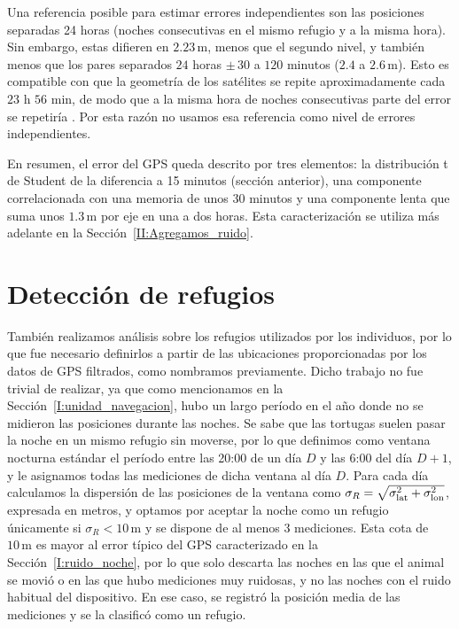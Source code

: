 Una referencia posible para estimar errores independientes son las posiciones separadas 24 horas (noches consecutivas en el mismo refugio y a la misma hora). 
Sin embargo, estas difieren en $2.23\,\mathrm{m}$, menos que el segundo nivel, y también menos que los pares separados $24$ horas $\pm\,30$ a $120$ minutos ($2.4$ a $2.6\,\mathrm{m}$). 
Esto es compatible con que la geometría de los satélites se repite aproximadamente cada $23$ h $56$ min, de modo que a la misma hora de noches consecutivas parte del error se repetiría \cite{choi2004}. 
Por esta razón no usamos esa referencia como nivel de errores independientes.

En resumen, el error del GPS queda descrito por tres elementos: la distribución t de Student de la diferencia a 15 minutos (sección anterior), una componente correlacionada 
con una memoria de unos 30 minutos y una componente lenta que suma unos $1.3\,\mathrm{m}$ por eje en una a dos horas. Esta caracterización se 
utiliza más adelante en la Sección~\ref{II:Agregamos_ruido}.

\section{Detección de refugios}\label{I:refugios}

También realizamos análisis sobre los refugios utilizados por los individuos, por lo que fue necesario definirlos a partir de las ubicaciones proporcionadas
por los datos de GPS filtrados, como nombramos previamente. Dicho trabajo no fue trivial de realizar, ya que como mencionamos en la Sección~\ref{I:unidad_navegacion}, 
hubo un largo período en el año donde no se midieron las posiciones durante las noches. Se sabe que las tortugas suelen pasar la noche en un mismo refugio 
sin moverse, por lo que definimos como ventana nocturna estándar el período entre las 20:00 de un día $D$ y las 6:00 del día $D+1$, y le asignamos todas las mediciones de dicha ventana al día $D$.
Para cada día calculamos la dispersión de las posiciones de la ventana como $\sigma_R=\sqrt{\sigma_{\rm lat}^2+\sigma_{\rm lon}^2}$, expresada en metros, y optamos por aceptar la noche como un refugio
únicamente si $\sigma_R<10\,\mathrm{m}$ y se dispone de al menos 3 mediciones. Esta cota de $10\,\mathrm{m}$ es mayor al error típico del GPS caracterizado en la Sección~\ref{I:ruido_noche}, 
por lo que solo descarta las noches en las que el animal se movió o en las que hubo mediciones muy ruidosas, y no las noches con el ruido habitual del dispositivo. 
En ese caso, se registró la posición media de las mediciones y se la clasificó como un refugio.

